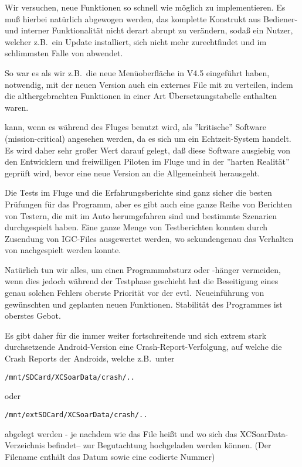 Wir versuchen, neue Funktionen so schnell wie möglich zu implementieren. Es muß hierbei natürlich abgewogen werden, das komplette Konstrukt
aus Bediener- und interner Funktionalität nicht derart abrupt zu verändern, sodaß ein Nutzer, welcher z.B.\ ein Update installiert, sich nicht
mehr zurechtfindet und im schlimmsten Falle von \xc abwendet.

So war es als wir z.B.\ die neue Menüoberfläche in V4.5 eingeführt haben,  notwendig, mit der neuen Version  auch ein externes
File mit zu verteilen, indem die althergebrachten Funktionen in einer Art Übersetzungstabelle enthalten waren.

\xc kann, wenn es während des Fluges benutzt wird, als ''kritische'' Software  (mission-critical) angesehen werden, da es sich um ein Echtzeit-System handelt.
Es wird daher sehr großer Wert darauf gelegt, daß diese Software ausgiebig von den Entwicklern und  freiwilligen Piloten im Fluge und in der ''harten Realität'' geprüft wird,
bevor eine neue Version an die Allgemeinheit herausgeht.

Die Tests im Fluge und die Erfahrungsberichte sind ganz sicher die besten  Prüfungen für das Programm, aber es gibt auch eine ganze Reihe
von Berichten von Testern, die mit \xc im Auto herumgefahren sind und bestimmte Szenarien durchgespielt haben.  Eine ganze Menge von
Testberichten konnten durch Zusendung von  IGC-Files ausgewertet werden, wo sekundengenau das Verhalten von \xc nachgespielt werden konnte.

Natürlich tun wir alles, um einen Programmabsturz oder -hänger vermeiden, wenn dies jedoch während der Testphase geschieht hat die Beseitigung eines genau solchen
Fehlers oberste Priorität vor der evtl.\  Neueinführung von gewünschten und geplanten neuen Funktionen.
Stabilität des Programmes ist oberstes Gebot.


Es gibt daher für die immer weiter fortschreitende und sich extrem stark durchsetzende Android-Version eine Crash-Report-Verfolgung,
auf welche die Crash Reports der Androids, welche z.B.\  unter
\begin{tabbing}
{\small\texttt{/mnt/SDCard/XCSoarData/crash/..}}\\
\qquad{}
\end{tabbing}
oder
\begin{tabbing}
{\small\texttt{/mnt/extSDCard/XCSoarData/crash/..}}\\
\qquad{}
\end{tabbing}
abgelegt werden - je nachdem wie das File heißt und wo sich das XCSoarData-Verzeichnis befindet--
zur Begutachtung hochgeladen werden können. (Der Filename enthält das Datum sowie eine codierte Nummer)


